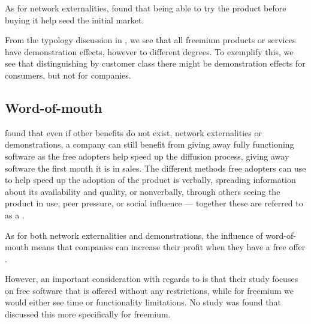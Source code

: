 As for network externalities, \citet{gallaugher2002} found that being able to try the product before buying it help seed the initial market.

From the typology discussion in , we see that all freemium products or services have demonstration effects, however to different degrees. To exemplify this, we see that distinguishing by customer class there might be demonstration effects for consumers, but not for companies. 

\subsection{Word-of-mouth}
\label{section:free:wom}

\citet{jiang2009} found that even if other benefits do not exist, \ie network externalities or demonstrations, a company can still benefit from giving away fully functioning software as the free adopters help speed up the diffusion process, \eg giving away software the first month it is in sales. The different methods free adopters can use to help speed up the adoption of the product is verbally, \eg spreading information about its availability and quality, or nonverbally, \eg through others seeing the product in use, peer pressure, or social influence --- together these are referred to as a  \citep{jiang2009}.

As for both network externalities and demonstrations, the influence of word-of-mouth means that companies can increase their profit when they have a free offer \citep{jiang2009}.

However, an important consideration with regards to \citet{jiang2009} is that their study focuses on free software that is offered without any restrictions, while for freemium we would either see time or functionality limitations. No study was found that discussed this more specifically for freemium.